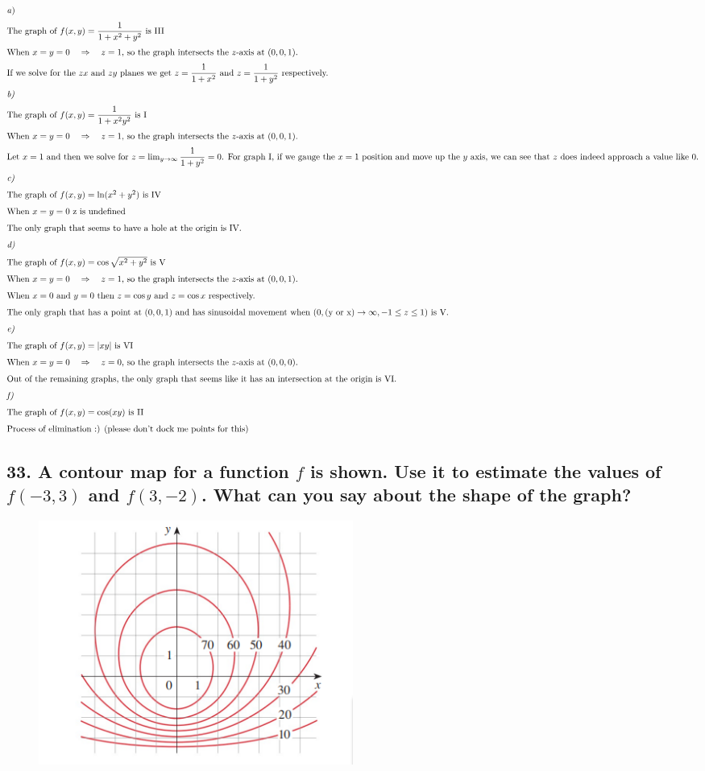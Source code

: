\documentclass{article}
\newcommand\rr{\quad\Rightarrow\quad}
\begin{document}
\begin{align*}
    \intertext{\textit a)}
    \intertext{The graph of $f(x,y) = \displaystyle\frac 1 {1 + x^2 + y^2}$ is III}
    \intertext{When $x = y = 0 \rr z = 1$, so the graph intersects the $z$-axis at $(0,0,1)$.}
    \intertext{If we solve for the $zx$ and $zy$ planes we get $z = \displaystyle\frac 1 {1 + x^2}$ and $z = \displaystyle\frac 1 {1 + y^2}$ respectively.}
    \intertext{\textit{b)}}
    \intertext{The graph of $f(x,y) = \displaystyle\frac 1 {1 + x^2 y^2}$ is I}
    \intertext{When $x = y = 0 \rr z = 1$, so the graph intersects the $z$-axis at $(0,0,1)$.}
    \intertext{Let $x = 1$ and then we solve for $z = \lim_{y \to \infty} \displaystyle\frac 1 {1 + y^2} = 0$. For graph I, if we gauge the $x = 1$ position and move up the $y$ axis, we can see that $z$ does indeed approach a value like 0.}
    \intertext{\textit{c)}}
    \intertext{The graph of $f(x,y) = \ln (x^2 + y^2)$ is IV}
    \intertext{When $x = y = 0$ z is undefined}
    \intertext{The only graph that seems to have a hole at the origin is IV.}
    \intertext{\textit{d)}} 
    \intertext{The graph of $f(x,y) = \cos \sqrt{x^2 + y^2}$ is V}
    \intertext{When $x = y = 0 \rr z = 1$, so the graph intersects the $z$-axis at $(0,0,1)$.}
    \intertext{When $x = 0$ and $y=0$ then $z=\cos y$ and $z=\cos x$ respectively.}
    \intertext{The only graph that has a point at $(0,0,1)$ and has sinusoidal movement when $(0, (\text{y or x}) \to \infty, -1 \leq z \leq 1)$ is V.}
    \intertext{\textit{e)}}
    \intertext{The graph of $f(x,y) = |xy|$ is VI}
    \intertext{When $x = y = 0 \rr z = 0$, so the graph intersects the $z$-axis at $(0,0,0)$.}
    \intertext{Out of the remaining graphs, the only graph that seems like it has an intersection at the origin is VI.}
    \intertext{\textit{f)}}
    \intertext{The graph of $f(x,y) = \cos (xy)$ is II}
    \intertext{Process of elimination :) (please don't dock me points for this)}
\end{align*}
\newpage
\subsection*{33. A contour map for a function $f$ is shown. Use it to estimate the values of $f(-3, 3)$ and $f(3, -2)$. What can you say about the shape of the graph?}

\begin{figure}[h]
    \begin{center}
        \includegraphics[width=0.5\textwidth]{figures/33.png}
    \end{center}
\end{figure}
\end{document}
